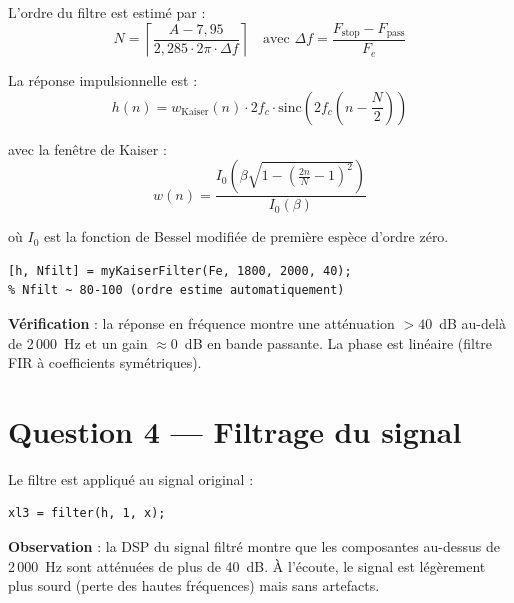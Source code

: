 \documentclass[12pt,a4paper]{article}
\begin{document}
L'ordre du filtre est estim\'e par :
\begin{equation}
    N = \left\lceil \frac{A - 7{,}95}{2{,}285 \cdot 2\pi \cdot \Delta f} \right\rceil
    \quad \text{avec } \Delta f = \frac{F_{\text{stop}} - F_{\text{pass}}}{F_e}
\end{equation}

La r\'eponse impulsionnelle est :
\begin{equation}
    h(n) = w_{\text{Kaiser}}(n) \cdot 2f_c \cdot \text{sinc}\!\left(2f_c\!\left(n - \frac{N}{2}\right)\right)
\end{equation}

avec la fen\^etre de Kaiser :
\begin{equation}
    w(n) = \frac{I_0\!\left(\beta\sqrt{1 - \left(\frac{2n}{N} - 1\right)^2}\right)}{I_0(\beta)}
\end{equation}

o\`u $I_0$ est la fonction de Bessel modifi\'ee de premi\`ere esp\`ece d'ordre z\'ero.

\begin{lstlisting}
[h, Nfilt] = myKaiserFilter(Fe, 1800, 2000, 40);
% Nfilt ~ 80-100 (ordre estime automatiquement)
\end{lstlisting}

\textbf{V\'erification} : la r\'eponse en fr\'equence montre une att\'enuation
$> 40$~dB au-del\`a de 2\,000~Hz et un gain $\approx 0$~dB en bande passante.
La phase est lin\'eaire (filtre FIR \`a coefficients sym\'etriques).

\section{Question 4 --- Filtrage du signal}

Le filtre est appliqu\'e au signal original :

\begin{lstlisting}
xl3 = filter(h, 1, x);
\end{lstlisting}

\textbf{Observation} : la DSP du signal filtr\'e montre que les composantes
au-dessus de 2\,000~Hz sont att\'enu\'ees de plus de 40~dB. \`A l'\'ecoute,
le signal est l\'eg\`erement plus sourd (perte des hautes fr\'equences) mais
sans artefacts.

\end{document}
